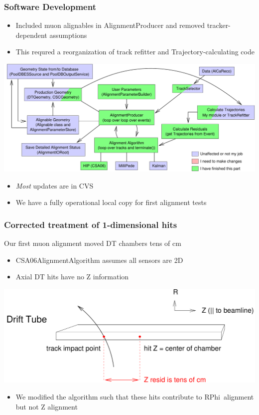 \documentclass[compress]{beamer}
\begin{document}
\begin{frame}
\frametitle{Software Development}

\begin{itemize}
  \item Included muon alignables in AlignmentProducer and removed
    tracker-dependent assumptions
  \item This requred a reorganization of track refitter and
    Trajectory-calculating code
\end{itemize}
\begin{center}
\includegraphics[width=0.75\linewidth]{flow_chart}
\end{center}

\vspace{-0.5 cm}
\begin{itemize}
  \item {\it Most} updates are in CVS
  \item We have a fully operational local copy for first alignment tests
\end{itemize}
\end{frame}

\begin{frame}
\frametitle{Corrected treatment of 1-dimensional hits}

\vfill
Our first muon alignment moved DT chambers tens of cm
\begin{itemize}
  \item CSA06AlignmentAlgorithm assumes all sensors are 2D
  \item Axial DT hits have no Z information
\end{itemize}

\vfill
\includegraphics[width=\linewidth]{onedimhit}

\vfill
\begin{itemize}
  \item We modified the algorithm such that these hits contribute to \mbox{RPhi alignment} but not Z alignment
\end{itemize}
\end{frame}
\end{document}
